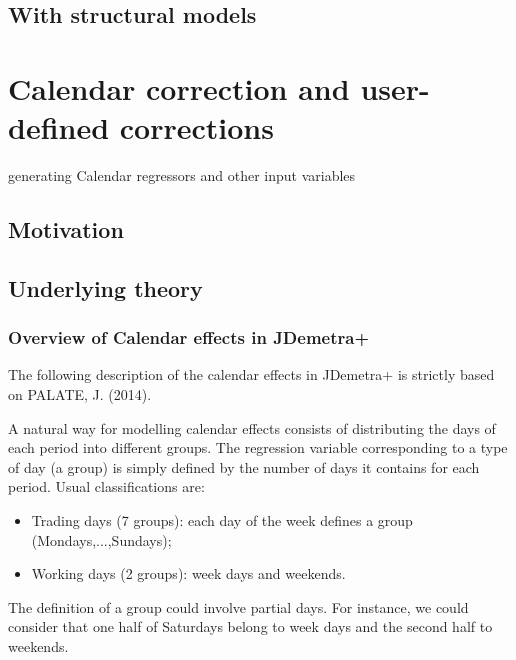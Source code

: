 \documentclass[
  letterpaper,
  DIV=11,
  numbers=noendperiod]{scrreprt}
\begin{document}
\hypertarget{with-structural-models}{%
\section{With structural models}\label{with-structural-models}}

\hypertarget{calendar-correction-and-user-defined-corrections}{%
\chapter{Calendar correction and user-defined
corrections}\label{calendar-correction-and-user-defined-corrections}}

generating Calendar regressors and other input variables

\hypertarget{motivation-2}{%
\section{Motivation}\label{motivation-2}}

\hypertarget{underlying-theory}{%
\section{Underlying theory}\label{underlying-theory}}

\hypertarget{overview-of-calendar-effects-in-jdemetra}{%
\subsection{Overview of Calendar effects in
JDemetra+}\label{overview-of-calendar-effects-in-jdemetra}}

The following description of the calendar effects in JDemetra+ is
strictly based on PALATE, J. (2014).

A natural way for modelling calendar effects consists of distributing
the days of each period into different groups. The regression variable
corresponding to a type of day (a group) is simply defined by the number
of days it contains for each period. Usual classifications are:

\begin{itemize}
\item
  Trading days (7 groups): each day of the week defines a group
  (Mondays,...,Sundays);
\item
  Working days (2 groups): week days and weekends.
\end{itemize}

The definition of a group could involve partial days. For instance, we
could consider that one half of Saturdays belong to week days and the
second half to weekends.
\end{document}

